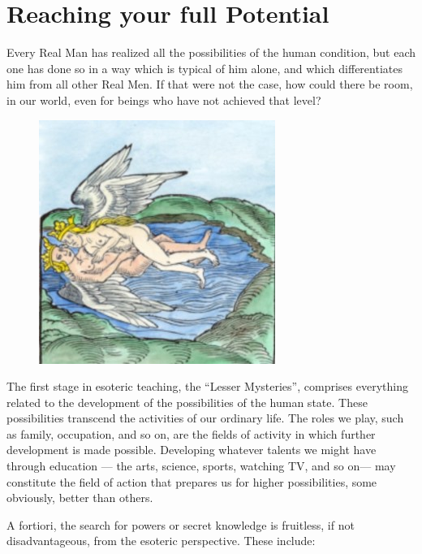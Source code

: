 \section{Reaching your full Potential}

\begin{quotex}
Every Real Man has realized all the possibilities of the human condition, but each one has done so in a way which is typical of him alone, and which differentiates him from all other Real Men. If that were not the case, how could there be room, in our world, even for beings who have not achieved that level? 

\end{quotex}

\begin{figure}
\centering
 \includegraphics[scale=.4]{a20210321ReachingyourfullPotential-img001.jpg} 
\end{figure}

The first stage in esoteric teaching, the “Lesser Mysteries”, comprises everything related to the development of the possibilities of the human state. These possibilities transcend the activities of our ordinary life. The roles we play, such as family, occupation, and so on, are the fields of activity in which further development is made possible. Developing whatever talents we might have through education — the arts, science, sports, watching TV, and so on— may constitute the field of action that prepares us for higher possibilities, some obviously, better than others.

A fortiori, the search for powers or secret knowledge is fruitless, if not disadvantageous, from the esoteric perspective. These include:

